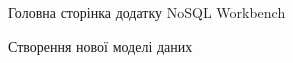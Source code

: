 \documentclass[a4paper,14pt]{extarticle} %
\begin{document}
\begin{figure}[H]
    \caption{Головна сторінка додатку NoSQL Workbench}
    \label{fig:main page NoSQL}
\end{figure}

\begin{figure}[H]
    \begin{minipage}[H]{0.44\linewidth}
    \end{minipage}
    \hfill
    \begin{minipage}[H]{0.54\linewidth}
    \end{minipage}
    \caption{Створення нової моделі даних}
    \label{fig:create a model NoSQL}
\end{figure}
\end{document}
